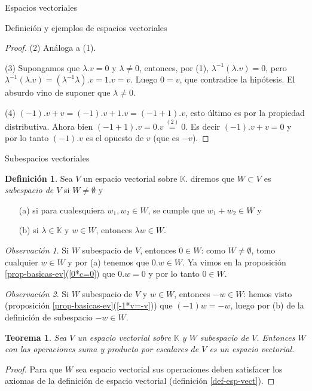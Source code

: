 \documentclass[a4paper,12pt,twoside,spanish,reqno]{amsbook}
\newtheorem{teorema}{Teorema}[section]
\theoremstyle{definition}
\newtheorem{definicion}{Definici\'on}[section]
\theoremstyle{remark}
\newtheorem{observacion}{Observaci\'on}[section]
\newcommand{\K}{\mathbb K}
\begin{document}
\begin{chapter}{Espacios vectoriales}
\begin{section}{Definición y ejemplos de espacios vectoriales}
\begin{proof}
                (2) Análoga a (1).
                
                (3) Supongamos que  $\lambda.v=0$ y  $\lambda \ne 0$, entonces, por (1), $ \lambda^{-1}(\lambda.v)=0$, pero $\lambda^{-1}(\lambda.v) = (\lambda^{-1}\lambda).v = 1.v = v$. Luego $0=v$,  que contradice la hipótesis. El absurdo vino de suponer que $\lambda \ne 0$.
                
                (4)  $(-1).v +v = (-1).v +1.v = (-1+1).v$,  esto último es por la propiedad distributiva. Ahora bien $(-1+1).v = 0.v \overset{(2)}{=} 0$. Es decir   $(-1).v +v = 0$ y por lo tanto  $(-1).v$ es el opuesto de $v$ (que es $-v$).  
            
            \end{proof}
   
\end{section}
    
\begin{section}{Subespacios vectoriales}
    \begin{definicion}
        Sea $V$ un espacio vectorial sobre $\K$. diremos que $W \subset V$ es \textit{subespacio de $V$} si $W \not= \emptyset$ y
        \begin{enumerate}
            \item[(a)] si para cualesquiera $w_1,w_2 \in W$, se cumple que $w_1+w_2 \in W$ y
            \item[(b)] si $\lambda \in \K$ y  $w \in W$, entonces $\lambda w \in W$.
        \end{enumerate}
    \end{definicion}

    \begin{observacion}\label{obs-0-en-subespacio} Si $W$ subespacio de $V$,  entonces $0 \in W$: como  $W \ne \emptyset$, tomo  cualquier $w \in W$ y  por (a) tenemos que $0.w \in W$. Ya vimos en la proposición \ref{prop-basicas-ev}(\ref{0*c=0})  que $0.w =0$ y por lo tanto $0 \in W$. 
    \end{observacion}

    \begin{observacion}\label{obs-opuesto-en-subespacio} Si $W$ subespacio de $V$ y $w \in W$,  entonces $-w \in W$: hemos visto (proposición \ref{prop-basicas-ev}(\ref{-1*v=-v})) que  $(-1)w=-w $, luego por (b) de la definición de subespacio $-w \in W$.
    \end{observacion}

    \begin{teorema}
        Sea $V$ un espacio vectorial sobre $\K$ y $W$ subespacio de $V$. Entonces $W$ con las operaciones suma y producto por escalares de $V$ es un espacio vectorial.
    \end{teorema}
    \begin{proof} 
        Para que $W$ sea espacio vectorial sus operaciones deben satisfacer los axiomas de la definición de espacio vectorial (definición \ref{def-esp-vect}). 
        

\end{proof}
\end{section}
\end{chapter}
\end{document}
